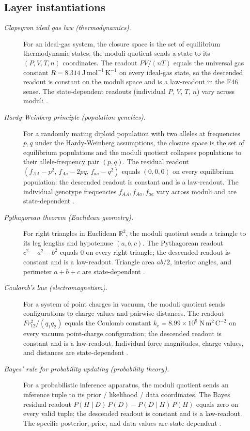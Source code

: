 \documentclass[11pt]{article}
\theoremstyle{definition}
\begin{document}
\subsection*{Layer instantiations}\label{layer-inst:F46}

\begin{description}
\item[\emph{Clapeyron ideal gas law (thermodynamics).}]
For an ideal-gas system, the closure space is the
set of equilibrium thermodynamic states; the moduli
quotient sends a state to its
\((P,V,T,n)\) coordinates.  The readout
\(PV/(nT)\) equals the universal gas constant
\(R=8.314\;\mathrm{J\,mol^{-1}\,K^{-1}}\) on
every ideal-gas state, so the descended readout is
constant on the moduli space and is a law-readout
in the F46 sense.  The state-dependent readouts
(individual \(P\), \(V\), \(T\), \(n\)) vary across
moduli \citep{Clapeyron1834Memoire}.

\item[\emph{Hardy-Weinberg principle (population
genetics).}]
For a randomly mating diploid population with two
alleles at frequencies \(p,q\) under the
Hardy-Weinberg assumptions, the closure space is
the set of equilibrium populations and the moduli
quotient collapses populations to their
allele-frequency pair \((p,q)\).  The residual readout
\((f_{AA}-p^2,\,f_{Aa}-2pq,\,f_{aa}-q^2)\) equals
\((0,0,0)\) on every equilibrium population: the
descended readout is constant and is a law-readout.
The individual genotype frequencies
\(f_{AA},f_{Aa},f_{aa}\) vary across moduli and are
state-dependent \citep{Hardy1908Mendelian}.

\item[\emph{Pythagorean theorem (Euclidean
geometry).}]
For right triangles in Euclidean \(\mathbb R^2\),
the moduli quotient sends a triangle to its leg
lengths and hypotenuse \((a,b,c)\).  The Pythagorean
readout \(c^2-a^2-b^2\) equals \(0\) on every right
triangle; the descended readout is constant and is
a law-readout.  Triangle area \(ab/2\), interior
angles, and perimeter \(a+b+c\) are state-dependent
\citep{Euclid300BCElements}.

\item[\emph{Coulomb's law (electromagnetism).}]
For a system of point charges in vacuum, the moduli
quotient sends configurations to charge values and
pairwise distances.  The readout
\(F r_{12}^2/(q_1 q_2)\) equals the Coulomb constant
\(k_e=8.99\times 10^9\;\mathrm{N\,m^2\,C^{-2}}\)
on every vacuum point-charge configuration; the
descended readout is constant and is a law-readout.
Individual force magnitudes, charge values, and
distances are state-dependent
\citep{Coulomb1785Memoires}.

\item[\emph{Bayes' rule for probability updating
(probability theory).}]
For a probabilistic inference apparatus, the moduli
quotient sends an inference tuple to its prior /
likelihood / data coordinates.  The Bayes residual
readout \(P(H\mid D)\,P(D)-P(D\mid H)\,P(H)\)
equals zero on every valid tuple; the descended
readout is constant and is a law-readout.  The
specific posterior, prior, and data values are
state-dependent \citep{Bayes1763Essay}.
\end{description}
\end{document}

